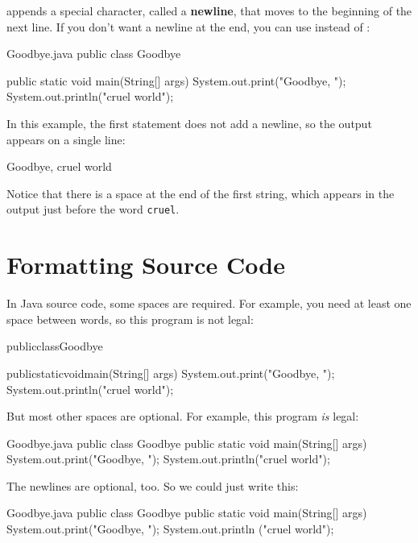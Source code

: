  appends a special character, called a {\bf newline}, that moves to the beginning of the next line.
If you don't want a newline at the end, you can use  instead of :


\begin{trinket}[235]{Goodbye.java}
public class Goodbye {

    public static void main(String[] args) {
        System.out.print("Goodbye, ");
        System.out.println("cruel world");
    }
}
\end{trinket}

\label{goodbye}

In this example, the first statement does not add a newline, so the output appears on a single line:

\begin{stdout}
Goodbye, cruel world
\end{stdout}

Notice that there is a space at the end of the first string, which appears in the output just before the word {\tt cruel}.


\section{Formatting Source Code}
\label{computer-programming_formatting-source-code}

In Java source code, some spaces are required.
For example, you need at least one space between words, so this program is not legal:

\begin{code}
publicclassGoodbye{

    publicstaticvoidmain(String[] args) {
        System.out.print("Goodbye, ");
        System.out.println("cruel world");
    }
}
\end{code}

But most other spaces are optional.
For example, this program {\em is} legal:

\begin{trinket}[220]{Goodbye.java}
public class Goodbye {
public static void main(String[] args) {
System.out.print("Goodbye, ");
System.out.println("cruel world");
}
}
\end{trinket}

The newlines are optional, too.
So we could just write this:

\begin{trinket}[175]{Goodbye.java}
public class Goodbye { public static void main(String[] args)
{ System.out.print("Goodbye, "); System.out.println
("cruel world");}}
\end{trinket}

